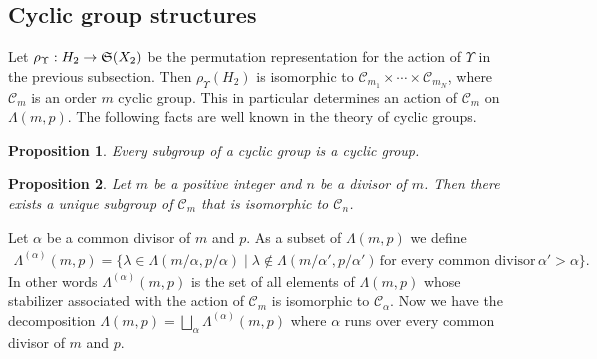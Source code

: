 \documentclass[11pt]{article}
\newtheorem{proposition}{Proposition}
\begin{document}
\subsection{Cyclic group structures}\label{subsec:3_2}

Let $\rho_{\Upsilon}: H_2 \rightarrow {\frak S}(X_2)$ be
the permutation representation for the
action of $\Upsilon$ in the previous subsection.
Then
$\rho_{\Upsilon} (H_2)$ is isomorphic to $\mathcal{C}_{m_1} \times \cdots \times \mathcal{C}_{m_N}$, where
$\mathcal{C}_m$ is an order $m$ cyclic group.
This in particular determines an action of $\mathcal{C}_m$ on $\Lambda (m,p)$.
The following facts are well known in the theory of cyclic groups.
\begin{proposition}
Every subgroup of a cyclic group is a cyclic group.
\end{proposition}
\begin{proposition}
Let $m$ be a positive integer and $n$ be a divisor of $m$.
Then  there exists a unique subgroup of $\mathcal{C}_m$ that is isomorphic to $\mathcal{C}_n$.
\end{proposition}
Let $\alpha$ be a common divisor of $m$ and $p$.
As a subset of $\Lambda (m,p)$ %
we def\/ine
\begin{gather}\label{eq:may12_1}
\Lambda^{(\alpha)} (m,p) = \{
\lambda \in \Lambda (m/\alpha,p/\alpha) \mid
\lambda \notin \Lambda (m/\alpha',p/\alpha') \, \mbox{for every common divisor} \, \alpha' > \alpha  \}.\!\!
\end{gather}
In other words
$\Lambda^{(\alpha)} (m,p)$ is the set of all elements of $\Lambda (m,p)$
whose stabilizer associated with
the action of {$\mathcal{C}_m$}
is isomorphic to $\mathcal{C}_\alpha$.
Now we have the decomposition $\Lambda (m,p) = \bigsqcup_{\alpha} \Lambda^{(\alpha)}(m,p)$
where $\alpha$ runs over every common divisor of $m$ and $p$.
\end{document}
